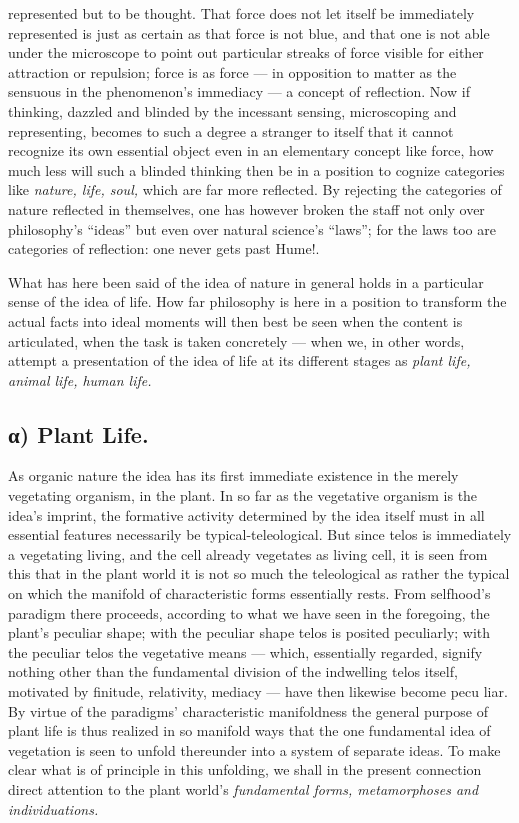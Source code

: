 \documentclass[12pt,a4paper]{book}
\begin{document}
{represented but to be thought. That force does not let itself be immediately
represented is just as certain as that force is not blue, and that one is not
able under the microscope to point out particular streaks of force visible for
either attraction or repulsion; force is as force --- in opposition to matter as
the sensuous in the phenomenon's immediacy --- a concept of reflection. Now if
thinking, dazzled and blinded by the incessant sensing, microscoping and
representing, becomes to such a degree a stranger to itself that it cannot
recognize its own essential object even in an elementary concept like force, how
much less will such a blinded thinking then be in a position to cognize categories
like \emph{nature, life, soul,} which are far more reflected. By rejecting the
categories of nature reflected in themselves, one has however broken the staff not
only over philosophy's ``ideas'' but even over natural science's ``laws''; for the
laws too are categories of reflection: one never gets past Hume!}.

What has here been said of the idea of nature in general holds in a particular
sense of the idea of life. How far philosophy is here in a position to transform
the actual facts into ideal moments will then best be seen when the content is
articulated, when the task is taken concretely --- when we, in other words,
attempt a presentation of the idea of life at its different stages as
\emph{plant life, animal life, human life.}

\subsection*{α) Plant Life.}

As organic nature the idea has its first immediate existence in the merely
vegetating organism, in the plant. In so far as the vegetative organism is the
idea's imprint, the formative activity determined by the idea itself must in all
essential features necessarily be typical-teleological. But since telos is
immediately a vegetating living, and the cell already vegetates as living cell,
it is seen from this that in the plant world it is not so much the teleological
as rather the typical on which the manifold of characteristic forms essentially
rests. From selfhood's paradigm there proceeds, according to what we have seen in
the foregoing, the plant's peculiar shape; with the peculiar shape telos is
posited peculiarly; with the peculiar telos the vegetative means --- which,
essentially regarded, signify nothing other than the fundamental division of the
indwelling telos itself, motivated by finitude, relativity, mediacy --- have then
likewise become pecu%
\setcounter{footnote}{0}%
liar. By virtue of the paradigms' characteristic manifoldness the general purpose
of plant life is thus realized in so manifold ways that the one fundamental idea
of vegetation is seen to unfold thereunder into a system of separate ideas. To
make clear what is of principle in this unfolding, we shall in the present
connection direct attention to the plant world's \emph{fundamental forms,
metamorphoses and individuations.}
\end{document}
